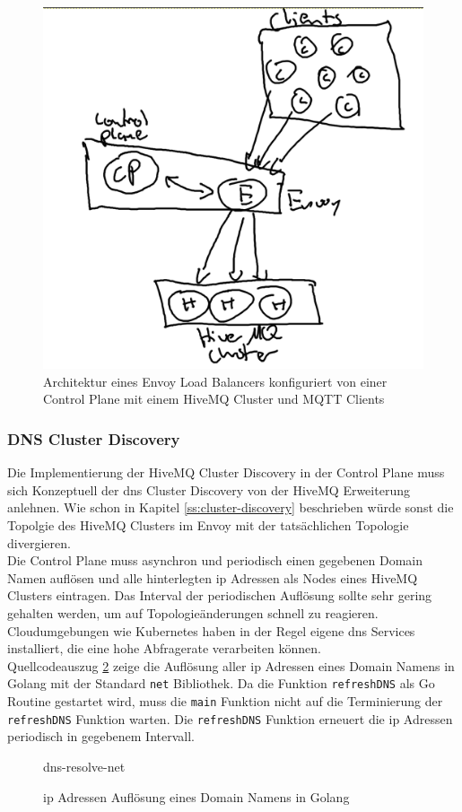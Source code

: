 \begin{figure}
    \centering
    \includegraphics[scale=0.5]{images/control-plane-architecture.png}
    \caption{Architektur eines Envoy Load Balancers konfiguriert von einer Control Plane mit einem HiveMQ Cluster und MQTT Clients}
    \label{fig:control-plane-architecture}
\end{figure}

\subsubsection{DNS Cluster Discovery} \label{ss:dns-discovery}
Die Implementierung der HiveMQ Cluster Discovery in der Control Plane muss sich Konzeptuell der \ac{dns} Cluster Discovery von der HiveMQ Erweiterung anlehnen. Wie schon in Kapitel \ref{ss:cluster-discovery} beschrieben würde sonst die Topolgie des HiveMQ Clusters im Envoy mit der tatsächlichen Topologie divergieren.
\\
Die Control Plane muss asynchron und periodisch einen gegebenen Domain Namen auflösen und alle hinterlegten \ac{ip} Adressen als Nodes eines HiveMQ Clusters eintragen. Das Interval der periodischen Auflösung sollte sehr gering gehalten werden, um auf Topologieänderungen schnell zu reagieren.
Cloudumgebungen wie Kubernetes haben in der Regel eigene \ac{dns} Services installiert, die eine hohe Abfragerate verarbeiten können.
\\
Quellcodeauszug \ref{code:dns-resolve-net} zeige die Auflösung aller \ac{ip} Adressen eines Domain Namens in Golang mit der Standard \verb|net| Bibliothek. Da die Funktion \verb|refreshDNS| als Go Routine gestartet wird, muss die \verb|main| Funktion nicht auf die Terminierung der \verb|refreshDNS| Funktion warten. Die \verb|refreshDNS| Funktion erneuert die \ac{ip} Adressen periodisch in gegebenem Intervall.
\begin{figure}
    {dns-resolve-net}
    \caption{\ac{ip} Adressen Auflösung eines Domain Namens in Golang}
    \label{code:dns-resolve-net}
\end{figure}

